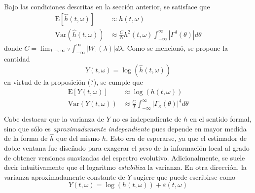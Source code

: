\documentclass[12pt,letterpaper,draft]{book}
\newcommand{\intR}{\int_{-\infty}^{\infty}}
\newcommand{\E}[1]{\mathrm{E}\left[ #1 \right]}
\newcommand{\Var}[1]{\mathrm{Var}\left( #1 \right)}
\newcommand{\abso}[1]{\left| #1 \right|}
\begin{document}
Bajo las condiciones descritas en la sección anterior, se satisface que
%
\begin{align*}
\E{\widehat{h}(t,\omega)} &\approx h(t,\omega) \\
\Var{\widehat{h}(t,\omega)} &\approx \frac{C}{N} h^{2}(t,\omega) \intR \abso{\Gamma^{4}(\theta)} d\theta
\end{align*}
%
donde $C = \lim_{T\rightarrow \infty} \tau \intR \abso{W_\tau(\lambda)} d\lambda$.
%
Como se mencionó, se propone la cantidad 
\begin{equation}
Y(t,\omega) = \log\left(\widehat{h}(t,\omega)\right)
\end{equation}
en virtud de la proposición (?), se cumple que
\begin{align}
\E{Y(t,\omega)} &\approx \log\left(h(t,\omega)\right) \\
\Var{Y(t,\omega)} &\approx \frac{C}{T} \intR \abso{\Gamma_\kappa(\theta)}^{4} d\theta \\
\end{align}
Cabe destacar que la varianza de $Y$ no es independiente de $h$ en el sentido formal, sino que sólo es \textit{aproximadamente independiente} pues depende en mayor medida de la forma de $\widehat{h}$ que del mismo $h$.
%
Esto era de esperarse, ya que el estimador de doble ventana fue diseñado para exagerar el \textit{peso} de la información local al grado de obtener versiones suavizadas del espectro evolutivo. 
%
Adicionalmente, se suele decir intuitivamente que el logaritmo \textit{estabiliza} la varianza. 
%
En otra dirección, la varianza aproximadamente constante de $Y$ sugiere que puede escribirse como
\begin{equation}
Y(t,\omega) = \log\left(h(t,\omega) \right) + \varepsilon(t,\omega)
\label{ye}
\end{equation}
\end{document}
